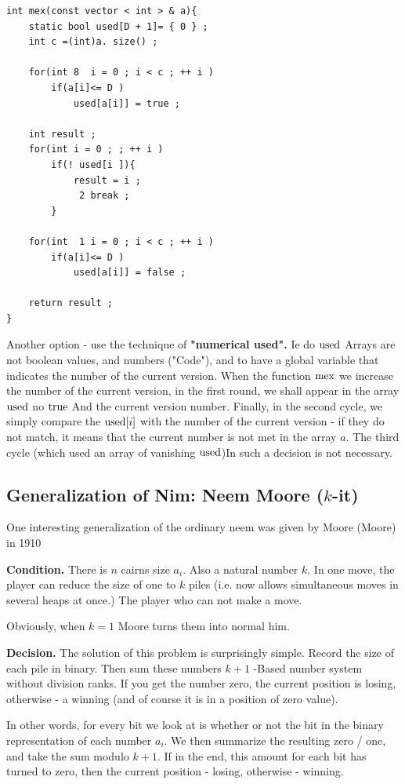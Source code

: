\begin{verbatim}
int mex(const vector < int > & a){
    static bool used[D + 1]= { 0 } ;
    int c =(int)a. size() ;
 
    for(int 8  i = 0 ; i < c ; ++ i )
        if(a[i]<= D )
            used[a[i]] = true ;
 
    int result ;
    for(int i = 0 ; ; ++ i )
        if(! used[i ]){
            result = i ;
             2 break ;
        }
 
    for(int  1 i = 0 ; i < c ; ++ i )
        if(a[i]<= D )
            used[a[i]] = false ;
 
    return result ;
} 
\end{verbatim}
Another option - use the technique of \textbf{"numerical used".} Ie do $\rm used$ Arrays are not boolean values, and numbers ("Code"), and to have a global variable that indicates the number of the current version. When the function $\rm mex$ we increase the number of the current version, in the first round, we shall appear in the array $\rm used$ no $\rm true$ And the current version number. Finally, in the second cycle, we simply compare the ${\rm used} [i]$ with the number of the current version - if they do not match, it means that the current number is not met in the array $a$. The third cycle (which used an array of vanishing $\rm used$)In such a decision is not necessary.

\subsection{ Generalization of Nim: Neem Moore ($k$-it) }

One interesting generalization of the ordinary neem was given by Moore (Moore) in 1910

\textbf{Condition.} There is $n$ cairns size $a_i$. Also a natural number $k$. In one move, the player can reduce the size of one to $k$ piles (i.e. now allows simultaneous moves in several heaps at once.) The player who can not make a move.

Obviously, when $k = 1$ Moore turns them into normal him.

\textbf{Decision.} The solution of this problem is surprisingly simple. Record the size of each pile in binary. Then sum these numbers $k +1$ -Based number system without division ranks. If you get the number zero, the current position is losing, otherwise - a winning (and of course it is in a position of zero value).

In other words, for every bit we look at is whether or not the bit in the binary representation of each number $a_i$. We then summarize the resulting zero / one, and take the sum modulo $k +1$. If in the end, this amount for each bit has turned to zero, then the current position - losing, otherwise - winning.

